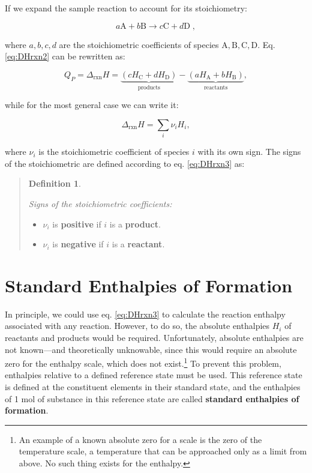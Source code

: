 \documentclass[
  9pt,
]{extbook}
\providecommand{\tightlist}{%
  \setlength{\itemsep}{0pt}\setlength{\parskip}{0pt}}
\theoremstyle{definition}
\newtheorem{definition}{Definition}[chapter]
\theoremstyle{definition}
\theoremstyle{definition}
\theoremstyle{definition}
\theoremstyle{remark}
\begin{document}
If we expand the sample reaction to account for its stoichiometry:

\[a\mathrm{A} + b\mathrm{B} \rightarrow c\mathrm{C} + d\mathrm{D}\; ,\]

where \(a,b,c,d\) are the stoichiometric coefficients of species \(\mathrm{A,B,C,D}\). Eq. \eqref{eq:DHrxn2} can be rewritten as:

\begin{equation}
  Q_P = \Delta_{\text{rxn}} H = \underbrace{\left( cH_{\mathrm{C}}+dH_{\mathrm{D}} \right) }_{\text{products}} - \underbrace{ \left( aH_{\mathrm{A}}+bH_{\mathrm{B}} \right)}_{\text{reactants}},
  \label{eq:DHrxn3}
\end{equation}

while for the most general case we can write it:

\begin{equation}
  \Delta_{\text{rxn}} H = \sum_i \nu_i H_i,
  \label{eq:DHrxn4}
\end{equation}

where \(\nu_i\) is the stoichiometric coefficient of species \(i\) with its own sign. The signs of the stoichiometric are defined according to eq. \eqref{eq:DHrxn3} as:

\begin{quote}
\begin{definition}
\protect\hypertarget{def:nui}{}\label{def:nui}

\emph{Signs of the stoichiometric coefficients:}

\begin{itemize}
\tightlist
\item
  \(\nu_i\) is \textbf{positive} if \(i\) is a \textbf{product}.
\item
  \(\nu_i\) is \textbf{negative} if \(i\) is a \textbf{reactant}.
\end{itemize}

\end{definition}
\end{quote}

\section{Standard Enthalpies of Formation}\label{formenthalpy}

In principle, we could use eq. \eqref{eq:DHrxn3} to calculate the reaction enthalpy associated with any reaction. However, to do so, the absolute enthalpies \(H_i\) of reactants and products would be required. Unfortunately, absolute enthalpies are not known---and theoretically unknowable, since this would require an absolute zero for the enthalpy scale, which does not exist.\footnote{An example of a known absolute zero for a scale is the zero of the temperature scale, a temperature that can be approached only as a limit from above. No such thing exists for the enthalpy.} To prevent this problem, enthalpies relative to a deﬁned reference state must be used. This reference state is defined at the constituent elements in their standard state, and the enthalpies of 1 mol of substance in this reference state are called \textbf{standard enthalpies of formation}.
\end{document}
